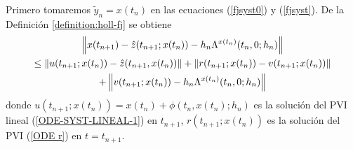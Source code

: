 Primero tomaremos $\widetilde{y}_n = x(t_n)$ en las ecuaciones (\ref{fjsyst0}) y (\ref{fjsyst}). De la Definición \ref{definition:holl-fj} se obtiene
\begin{multline}
    \left\lVert  x(t_{n+1}) - \hat{z}(t_{n+1};x(t_n))-h_n\Lambda^{x(t_n)}(t_n,0;h_n) \right\rVert \\
    \leq \left\lVert u(t_{n+1};x(t_n))-\hat{z}(t_{n+1},x(t_n)) \right\rVert
    + \left\lVert r(t_{n+1};x(t_n))-v(t_{n+1};x(t_n)) \right\rVert  \\+ \left\lVert v(t_{n+1};x(t_n))-h_n\Lambda^{x(t_n)}(t_n,0;h_n) \right\rVert
    \label{ineq:main}
\end{multline}
donde  $u(t_{n+1};x(t_n))=x(t_n)+\phi(t_n,x(t_n);h_n)$ es la solución del PVI lineal (\ref{ODE-SYST-LINEAL-1}) en  $t_{n+1}$, $r(t_{n+1};x(t_n))$ es la solución del PVI (\ref{ODE r}) en  $t = t_{n+1}$.

